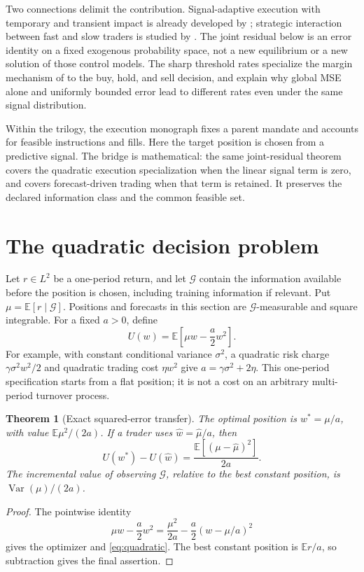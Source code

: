 \documentclass[11pt]{article}
\theoremstyle{plain}
\newtheorem{theorem}{Theorem}[section]
\theoremstyle{definition}
\theoremstyle{remark}
\newcommand{\E}{\mathbb E}
\DeclareMathOperator{\Var}{Var}
\begin{document}
Two connections delimit the contribution. Signal-adaptive execution
with temporary and transient impact is already developed by
\citet{NeumanVoss2022}; strategic interaction between fast and slow
traders is studied by \citet{ContMicheliNeuman2025}. The joint residual
below is an error identity on a fixed exogenous probability space,
not a new equilibrium or a new solution of those control models.
The sharp threshold rates specialize the margin mechanism of
\citet{AudibertTsybakov2007} to the buy, hold, and sell decision, and
explain why global MSE alone and uniformly bounded error lead to
different rates even under the same signal distribution.

Within the trilogy, the execution monograph
\citep{NoguerAlonso2026Execution} fixes a parent mandate and accounts
for feasible instructions and fills. Here the target position is
chosen from a predictive signal. The bridge is mathematical:
the same joint-residual theorem covers the quadratic execution
specialization when the linear signal term is zero, and covers
forecast-driven trading when that term is retained. It preserves
the declared information class and the common feasible set.

\section{The quadratic decision problem}

Let \(r\in L^2\) be a one-period return, and let \(\mathcal G\) contain
the information available before the position is chosen, including
training information if relevant. Put \(\mu=\E[r\mid\mathcal G]\).
Positions and forecasts in this section are \(\mathcal G\)-measurable
and square integrable. For a fixed \(a>0\), define
\[
U(w)=\E\left[\mu w-\frac a2w^2\right].
\]
For example, with constant conditional variance \(\sigma^2\), a
quadratic risk charge \(\gamma\sigma^2w^2/2\) and quadratic trading cost
\(\eta w^2\) give \(a=\gamma\sigma^2+2\eta\).
This one-period specification starts from a flat position; it is not
a cost on an arbitrary multi-period turnover process.

\begin{theorem}[Exact squared-error transfer]\label{thm:quadratic}
The optimal position is \(w^\ast=\mu/a\), with value
\(\E\mu^2/(2a)\). If a trader uses \(\widehat w=\widehat\mu/a\), then
\begin{equation}\label{eq:quadratic}
U(w^\ast)-U(\widehat w)=\frac{\E[(\mu-\widehat\mu)^2]}{2a}.
\end{equation}
The incremental value of observing \(\mathcal G\), relative to the best
constant position, is \(\Var(\mu)/(2a)\).
\end{theorem}
\begin{proof}
The pointwise identity
\[
\mu w-\frac a2w^2=\frac{\mu^2}{2a}-\frac a2(w-\mu/a)^2
\]
gives the optimizer and \eqref{eq:quadratic}. The best constant position
is \(\E r/a\), so subtraction gives the final assertion.
\end{proof}
\end{document}
